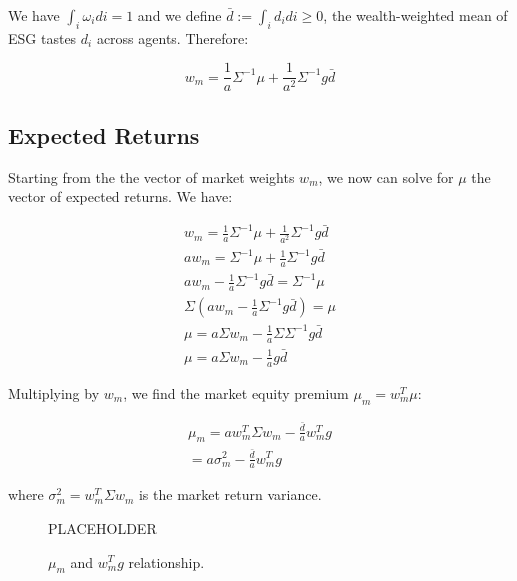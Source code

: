 We have $\int_i \omega_i di = 1$ and we define $\bar{d} := \int_i d_i di \geq 0$,
the wealth-weighted mean of ESG tastes $d_i$ across agents. Therefore:

\begin{equation}
    w_m = \frac{1}{a} \Sigma^{-1} \mu + \frac{1}{a^2} \Sigma^{-1} g \bar{d}
\end{equation}

\subsection{Expected Returns}

Starting from the the vector of market weights $w_m$, we now can 
solve for $\mu$ the vector of expected returns. We have:

\begin{equation}
    \begin{aligned}
    w_m = \frac{1}{a} \Sigma^{-1} \mu + \frac{1}{a^2} \Sigma^{-1} g \bar{d} \\
    a w_m = \Sigma^{-1} \mu + \frac{1}{a} \Sigma^{-1} g \bar{d} \\
    a w_m - \frac{1}{a} \Sigma^{-1} g \bar{d} = \Sigma^{-1} \mu \\
    \Sigma (a w_m - \frac{1}{a} \Sigma^{-1} g \bar{d}) = \mu \\ 
    \mu = a \Sigma w_m - \frac{1}{a} \Sigma \Sigma^{-1} g \bar{d} \\
    \mu = a \Sigma w_m - \frac{1}{a} g \bar{d}
    \end{aligned}
\end{equation}

Multiplying by $w_m$, we find the market equity premium $\mu_m = w_m^T \mu$:

\begin{equation}
    \begin{aligned}
    \mu_m = a w_m^T \Sigma w_m - \frac{\bar{d}}{a} w_m^T g  \\
    = a \sigma_m^2 - \frac{\bar{d}}{a} w_m^T g 
    \end{aligned}
\end{equation}

where $\sigma_m^2 = w_m^T \Sigma w_m$ is the market return variance. 

\begin{figure}
    \centering
    PLACEHOLDER
    \caption{$\mu_m$ and $w_m^Tg$ relationship.}
    \label{fig:green_market}
\end{figure}

